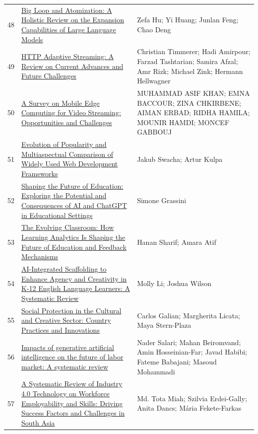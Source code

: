 \documentclass[11pt]{article}
\begin{document}
\begin{longtable}{cp{8cm}p{5cm}}
  48 & \href{https://www.mdpi.com/2076-3417/15/17/9466}{Big Loop and Atomization: A Holistic Review on the Expansion Capabilities of Large Language Models} & Zefa Hu; Yi Huang; Junlan Feng; Chao Deng \\
  49 & \href{https://dl.acm.org/doi/10.1145/3736306}{HTTP Adaptive Streaming: A Review on Current Advances and Future Challenges} & Christian Timmerer; Hadi Amirpour; Farzad Tashtarian; Samira Afzal; Amr Rizk; Michael Zink; Hermann Hellwagner \\
  50 & \href{https://arxiv.org/abs/2209.05761}{A Survey on Mobile Edge Computing for Video Streaming: Opportunities and Challenges} & MUHAMMAD ASIF KHAN; EMNA BACCOUR; ZINA CHKIRBENE; AIMAN ERBAD; RIDHA HAMILA; MOUNIR HAMDI; MONCEF GABBOUJ \\
  51 & \href{https://www.mdpi.com/2079-9292/12/17/3563}{Evolution of Popularity and Multiaspectual Comparison of Widely Used Web Development Frameworks} & Jakub Swacha; Artur Kulpa \\
  52 & \href{https://www.mdpi.com/2227-7102/13/7/692}{Shaping the Future of Education: Exploring the Potential and Consequences of AI and ChatGPT in Educational Settings} & Simone Grassini \\
  53 & \href{https://www.mdpi.com/2227-7102/14/2/176}{The Evolving Classroom: How Learning Analytics Is Shaping the Future of Education and Feedback Mechanisms} & Hanan Sharif; Amara Atif \\
  54 & \href{https://www.mdpi.com/2078-2489/16/7/519}{AI-Integrated Scaffolding to Enhance Agency and Creativity in K-12 English Language Learners: A Systematic Review} & Molly Li; Joshua Wilson \\
  55 & \href{https://socialprotection-humanrights.org/resource/social-protection-in-the-cultural-and-creative-sectorcountry-practices-and-innovations/}{Social Protection in the Cultural and Creative Sector: Country Practices and Innovations} & Carlos Galian; Margherita Licata; Maya Stern-Plaza \\
  56 & \href{https://www.sciencedirect.com/science/article/pii/S2451958825000673}{Impacts of generative artificial intelligence on the future of labor market: A systematic review} & Nader Salari; Mahan Beiromvand; Amin Hosseinian-Far; Javad Habibi; Fateme Babajani; Masoud Mohammadi \\
  57 & \href{https://www.mdpi.com/2227-7099/12/2/35}{A Systematic Review of Industry 4.0 Technology on Workforce Employability and Skills: Driving Success Factors and Challenges in South Asia} & Md. Tota Miah; Szilvia Erdei-Gally; Anita Dancs; Mária Fekete-Farkas \\

\end{longtable}
\end{document}
